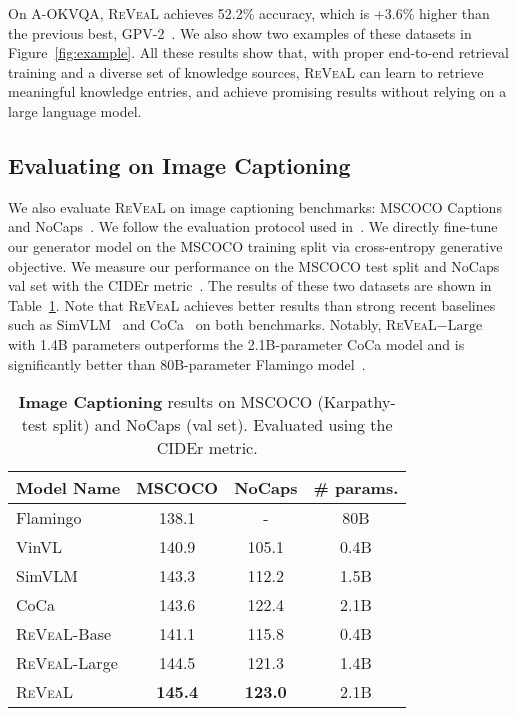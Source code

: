 \documentclass[10pt,twocolumn,letterpaper]{article}
\newcommand{\method}{R\textsc{e}V\textsc{ea}L\xspace}
\begin{document}
On A-OKVQA, 
\method achieves 52.2\% accuracy, which is +3.6\% higher than the previous best, GPV-2~\cite{DBLP:conf/eccv/KamathCGKHK22}. We also show two examples of these datasets in Figure~\ref{fig:example}.
All these results show that, with proper end-to-end retrieval training and a diverse set of knowledge sources, \method can learn to retrieve meaningful knowledge entries, and achieve promising results without relying on a large language model.



\subsection{Evaluating on Image Captioning}\label{sec:caption}

We also evaluate \method on image captioning benchmarks: MSCOCO Captions~\cite{DBLP:journals/corr/ChenFLVGDZ15} and NoCaps~\cite{DBLP:conf/iccv/AgrawalAD0CJ0BP19}. We follow the evaluation protocol used in~\cite{DBLP:journals/corr/abs-2205-01917}. We directly fine-tune our generator model on the MSCOCO training split via cross-entropy generative objective. We measure our performance on the MSCOCO test split and NoCaps val set with the CIDEr metric~\cite{DBLP:conf/cvpr/VedantamZP15}. 
The results of these two datasets are shown in Table~\ref{tab:caption}. Note that \method achieves better results than strong recent baselines such as SimVLM~\cite{DBLP:conf/iclr/WangYYDT022} and CoCa~\cite{DBLP:journals/corr/abs-2205-01917} on both benchmarks. Notably, \method$-{\text{Large}}$ with 1.4B parameters outperforms the 2.1B-parameter CoCa model and is significantly better than 80B-parameter Flamingo model~\cite{DBLP:journals/corr/abs-2204-14198}. 

\begin{table}[t!]
\centering
\footnotesize
\vspace{-.1in}
\begin{tabular}{l|cc|c} \toprule
\textbf{Model Name} & \textbf{MSCOCO} & \textbf{NoCaps} & \textbf{\# params.} \\ \midrule
Flamingo~\cite{DBLP:journals/corr/abs-2204-14198}  & 138.1 & -   & 80B\\
VinVL~\cite{DBLP:conf/cvpr/ZhangLHY0WCG21} & 140.9 & 105.1 & 0.4B \\
SimVLM~\cite{DBLP:conf/iclr/WangYYDT022}  & 143.3 & 112.2 & 1.5B\\
CoCa~\cite{DBLP:journals/corr/abs-2205-01917} & 143.6 & 122.4 & 2.1B \\ 
\midrule
\method-Base & 141.1 & 115.8 & 0.4B  \\
\method-Large & 144.5 & 121.3 & 1.4B \\
\method & \textbf{145.4} & \textbf{123.0} & 2.1B \\\bottomrule
\end{tabular}
    \vspace{-.1in}
\caption{\textbf{Image Captioning} results on MSCOCO (Karpathy-test split) and NoCaps (val set). Evaluated using the CIDEr metric.}
\label{tab:caption}
\end{table}
\end{document}
